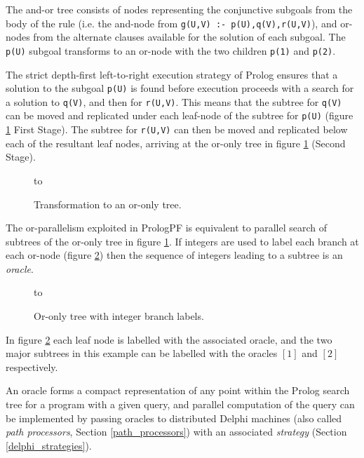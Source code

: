 The and-or tree consists of nodes representing the conjunctive subgoals from
the body of the rule (i.e. the and-node from \texttt{g(U,V) :- p(U),q(V),r(U,V)}),
and or-nodes from the alternate clauses available for the solution of each
subgoal.  The \texttt{p(U)} subgoal transforms to an or-node with the two
children \texttt{p(1)} and \texttt{p(2)}.

The strict depth-first left-to-right execution strategy of Prolog ensures that
a solution to the subgoal \texttt{p(U)} is found before execution proceeds with
a search for a solution to \texttt{q(V)}, and then for \texttt{r(U,V)}.
This means that the subtree for \texttt{q(V)} can be moved and replicated under
each leaf-node of the subtree for \texttt{p(U)}
(figure \ref{or_only_tree} First Stage).
 The subtree for \texttt{r(U,V)}
can then be moved and replicated below each of the resultant leaf nodes, arriving
at the or-only tree in figure \ref{or_only_tree} (Second Stage).

\begin{figure}[htb]
\vspace{5mm} \hbox to 
\caption{Transformation to an or-only tree.}
\vspace{5mm}
\label{or_only_tree}
\end{figure}

The or-parallelism exploited in PrologPF is equivalent to parallel search
of subtrees of the or-only tree in figure \ref{or_only_tree}.  If integers are
used to label each branch at each or-node (figure \ref{oracle_tree}) then the
sequence of integers leading to a subtree is an \textit{oracle}.

\begin{figure}[htb]
\vspace{5mm} \hbox to 
\caption{Or-only tree with integer branch labels.}
\vspace{5mm}
\label{oracle_tree}
\end{figure}

In figure \ref{oracle_tree} each leaf node is labelled with the associated oracle,
and the two major subtrees in this example can be labelled with the oracles
$[1]$ and $[2]$ respectively.

An oracle forms a compact representation of any point within the Prolog
search tree for a program with a given query, and parallel computation of the
query can be implemented by passing oracles to distributed Delphi machines
(also called \textit{path processors}, Section \ref{path_processors})
with an associated \textit{strategy} (Section \ref{delphi_strategies}).

